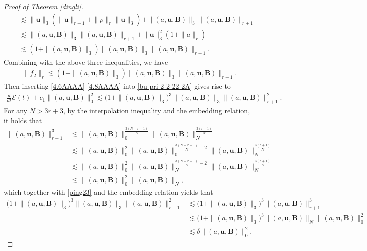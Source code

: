 \documentclass[12pt, reqno]{amsart}
\numberwithin{equation}{section}
\numberwithin{equation}{section}
\numberwithin{equation}{section}
\numberwithin{equation}{section}
\theoremstyle{remark}
\def\u{ \mathbf{u} }
\def\b{ \mathbf{B} }
\begin{document}
\begin{proof}[Proof of Theorem \ref{dingli}]
\begin{equation*}
\begin{split}
&\quad\lesssim\|\u\|_3(\|\u\|_{r+1}+\|\rho\|_{r}\|\u\|_{3})+\|(a,\u,\b)\|_3\|(a,\u,\b)\|_{r+1}\\
&\quad\lesssim\|(a,\u,\b)\|_3\|(a,\u,\b)\|_{r+1}+\|\u\|_3^2(1+\|a\|_{r})
\\&\quad\lesssim (1+\|(a,\u,\b)\|_3)\|(a,\u,\b)\|_3\|(a,\u,\b)\|_{r+1}.%
\end{split}\end{equation*}
Combining  with the above three inequalities,  we have
\begin{equation}\begin{split}\label{4.8AAAA}
\|f_2\|_{r}\lesssim (1+\|(a,\u,\b)\|_3)\|(a,\u,\b)\|_3\|(a,\u,\b)\|_{r+1}.
\end{split}\end{equation}
Then inserting \eqref{4.6AAAA}-\eqref{4.8AAAA} into \eqref{bu-pri-2-2-22-2A} gives rise to
\begin{equation}\label{pri-2-2-22-2}
\begin{split}
\frac{d}{dt}{\mathcal{E}(t)}+c_1\|(a,\u,\b)\|_{0}^2\lesssim \big(1+\|(a,\u,\b)\|_3\big)^3\|(a,\u,\b)\|_3\|(a,\u,\b)\|^2_{r+1}.
\end{split}\end{equation}
For any ${N}>3r+3$, by the interpolation inequality and the embedding relation, it holds that
\begin{equation*}\begin{split}
\|(a,\u,\b)\|^3_{r+1}&\lesssim \|(a,\u,\b)\|_{0}^{\frac{3(N-r-1)}{N}}\|(a,\u,\b)\|_{N}^{\frac{3(r+1)}{N}}
\\&\lesssim\|(a,\u,\b)\|_{0}^{2}\|(a,\u,\b)\|_{0}^{\frac{3(N-r-1)}{N}-2}\|(a,\u,\b)\|_{N}^{\frac{3(r+1)}{N}}
\\&\lesssim\|(a,\u,\b)\|_{0}^{2}\|(a,\u,\b)\|_{N}^{\frac{3(N-r-1)}{N}-2}\|(a,\u,\b)\|_{N}^{\frac{3(r+1)}{N}}
\\&\lesssim\|(a,\u,\b)\|_{0}^{2}\|(a,\u,\b)\|_{N},
\end{split}\end{equation*}
which together with \eqref{ping23} and the embedding relation yields that
\begin{equation*}\label{pri-2-2-22-4}
\begin{split}\big(1+\|(a,\u,\b)\|_3\big)^3\|(a,\u,\b)\|_3\|(a,\u,\b)\|^2_{r+1}
&\lesssim \big(1+\|(a,\u,\b)\|_3\big)^3\|(a,\u,\b)\|^3_{r+1}
\\&\lesssim\big(1+\|(a,\u,\b)\|_3\big)^3\|(a,\u,\b)\|_{N}\|(a,\u,\b)\|_{0}^{2}
\\&\lesssim\delta\|(a,\u,\b)\|_{0}^{2}.

\end{split}
\end{equation*}
\end{proof}
\end{document}

